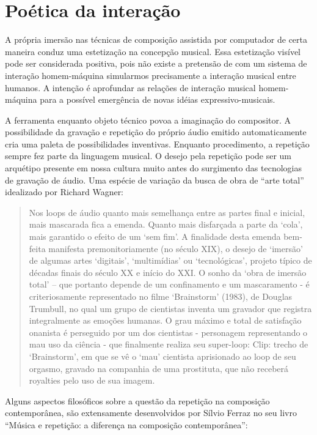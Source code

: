 \documentclass[draft]{ppgmus}
\begin{document}
\section{Poética da interação}


A própria imersão nas técnicas de composição assistida por computador de certa
maneira conduz uma estetização na concepção musical. Essa estetização visível
pode ser considerada positiva, pois não existe a pretensão de com um sistema 
de interação homem-máquina simularmos precisamente a interação musical entre
humanos. A intenção é aprofundar as relações de interação musical homem-máquina
para a possível emergência de novas idéias expressivo-musicais. 

A ferramenta enquanto objeto técnico povoa a imaginação do compositor. A possibilidade
da gravação e repetição do próprio áudio emitido automaticamente cria uma paleta de
possibilidades inventivas. Enquanto procedimento, a repetição sempre fez parte da linguagem
musical. O desejo pela repetição pode ser um arquétipo presente em nossa cultura
muito antes do surgimento das tecnologias de gravação de áudio. Uma espécie
de variação da busca de obra de ``arte total'' idealizado por Richard Wagner: 


\begin{quote}
 Nos loops de áudio quanto mais semelhança entre as partes final e inicial, mais mascarada fica a
emenda. Quanto mais disfarçada a parte da ‘cola’, mais garantido o efeito de um ‘sem fim’. A finalidade
desta emenda bem-feita manifesta premonitoriamente (no século XIX), o desejo de ‘imersão’ de algumas
artes ‘digitais’, ‘multimídias’ ou ‘tecnológicas’, projeto típico de décadas finais do século XX e início do
XXI. O sonho da ‘obra de imersão total’ – que portanto depende de um confinamento e um mascaramento -
é criteriosamente representado no filme ‘Brainstorm’ (1983), de Douglas Trumbull, no qual um grupo de
cientistas inventa um gravador que registra integralmente as emoções humanas. O grau máximo e total de
satisfação onanista é perseguido por um dos cientistas - personagem representando o mau uso da ciência -
que finalmente realiza seu super-loop:
Clip: trecho de ‘Brainstorm’, em que se vê o ‘mau’ cientista aprisionado ao loop de seu orgasmo, gravado na
companhia de uma prostituta, que não receberá royalties pelo uso de sua imagem. \cite{caesarloop}
\end{quote} 

Alguns aspectos filosóficos sobre a questão da repetição na composição contemporânea,
são extensamente desenvolvidos por Sílvio Ferraz no seu livro 
``Música e repetição: a diferença na composição contemporânea'':
 
\end{document}

